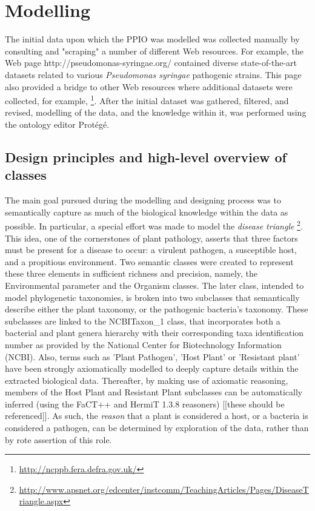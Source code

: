 \documentclass[sw]{iosart2c}
\newcommand{\myurl}[1]{\footnote{\url{#1}}}
\begin{document}



\section{Modelling}

The initial data upon which the PPIO was modelled was collected manually by consulting and "scraping" a number of different Web resources. For example, the Web page http://pseudomonas-syringae.org/ contained diverse state-of-the-art datasets related to various {\itshape Pseudomonas syringae} pathogenic strains. This page also provided a bridge to other Web resources where additional datasets were collected, for example,  \myurl{http://ncppb.fera.defra.gov.uk/}. After the initial dataset was gathered, filtered, and revised, modelling of the data, and the knowledge within it, was performed using the ontology editor Prot\'eg\'e.

\subsection{Design principles and high-level overview of classes}

The main goal pursued during the modelling and designing process was to semantically capture as much of the biological knowledge within the data as possible. In particular, a special effort was made to model the {\itshape disease triangle} \myurl{http://www.apsnet.org/edcenter/instcomm/TeachingArticles/Pages/DiseaseTriangle.aspx}. This idea, one of the cornerstones of plant pathology, asserts that three factors must be present for a disease to occur: a virulent pathogen, a susceptible host, and a propitious environment. Two semantic classes were created to represent these three elements in sufficient richness and precision, namely, the {\sf Environmental parameter} and the {\sf Organism} classes. The later class, intended to model phylogenetic taxonomies, is broken into two subclasses that semantically describe either the plant taxonomy, or the pathogenic bacteria's taxonomy.  These subclasses are linked to the {\sf NCBITaxon\_1} class, that incorporates both a bacterial and plant genera hierarchy with their corresponding taxa identification number as provided by the National Center for Biotechnology Information (NCBI). Also, terms such as {\sf 'Plant Pathogen'}, {\sf 'Host Plant'} or { \sf 'Resistant plant'} have been strongly axiomatically modelled to deeply capture details within the extracted biological data.  Thereafter, by making use of axiomatic reasoning, members of the {\sf Host Plant} and {\sf Resistant Plant} subclasses can be automatically inferred (using the FaCT++ and HermiT 1.3.8 reasoners) [[these should be referenced]]. As such, the {\itshape reason} that a plant is considered a host, or a bacteria is considered a pathogen, can be determined by exploration of the data, rather than by rote assertion of this role.
\end{document}
